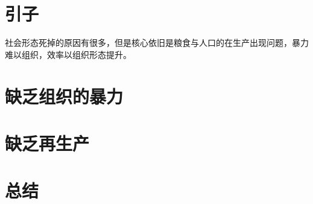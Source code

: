 \section{引子}
社会形态死掉的原因有很多，但是核心依旧是粮食与人口的在生产出现问题，暴力难以组织，效率以组织形态提升。
\section{缺乏组织的暴力}
\section{缺乏再生产}
\section{总结}
